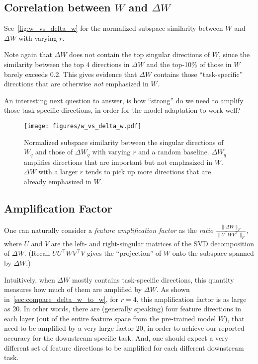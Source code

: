 \documentclass{article} %
\begin{document}
\subsection{Correlation between $W$ and $\Delta W$}
\label{app:corr_w_delta_w}

See~\autoref{fig:w_vs_delta_w} for the normalized subspace similarity between $W$ and $\Delta W$ with varying $r$.

Note again that $\Delta W$ does not contain the top singular directions of $W$, since the similarity between the top 4 directions in $\Delta W$ and the top-10\% of those in $W$ barely exceeds 0.2. This gives evidence that $\Delta W$ contains those ``task-specific'' directions that are otherwise \emph{not} emphasized in $W$.

An interesting next question to answer, is how ``strong'' do we need to amplify those task-specific directions, in order for the model adaptation to work well?

\begin{figure}[h]
  \centering
    \texttt{[image: figures/w\_vs\_delta\_w.pdf]}
    \caption{Normalized subspace similarity between the singular directions of $W_q$ and those of $\Delta W_q$ with varying $r$ and a random baseline. $\Delta W_q$ amplifies directions that are important but not emphasized in $W$. $\Delta W$ with a larger $r$ tends to pick up more directions that are already emphasized in $W$.}
    \label{fig:w_vs_delta_w}
\end{figure}

\subsection{Amplification Factor}
\label{app:amplification_factor}

One can naturally consider a \emph{feature amplification factor} as the \emph{ratio} $\frac{\|\Delta W\|_F}{\|U^\top WV^\top\|_F}$, where $U$ and $V$ are the left- and right-singular matrices of the SVD decomposition of $\Delta W$. (Recall $UU^\top WV^\top V$ gives the ``projection'' of $W$ onto the subspace spanned by $\Delta W$.)

Intuitively, when $\Delta W$ mostly contains task-specific directions, this quantity measures how much of them are amplified by $\Delta W$.
As shown in~\autoref{sec:compare_delta_w_to_w}, for $r=4$, this amplification factor is as large as 20. In other words, there are (generally speaking) four feature directions in each layer (out of the entire feature space from the pre-trained model $W$), that need to be amplified by a very large factor 20, in order to achieve our reported accuracy for the downstream specific task. And, one should expect a very different set of feature directions  to be amplified for each different downstream task.
\end{document}
